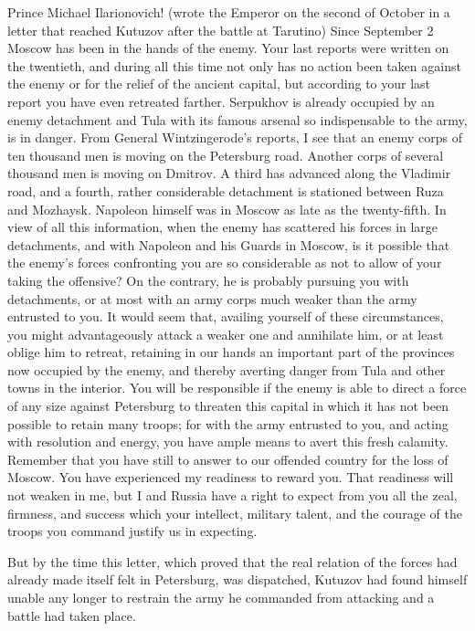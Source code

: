 Prince Michael Ilarionovich! (wrote the Emperor on the second of
October in a letter that reached Kutuzov after the battle at
Tarutino) Since September 2 Moscow has been in the hands of the
enemy. Your last reports were written on the twentieth, and
during all this time not only has no action been taken against
the enemy or for the relief of the ancient capital, but according
to your last report you have even retreated farther. Serpukhov is
already occupied by an enemy detachment and Tula with its famous
arsenal so indispensable to the army, is in danger. From General
Wintzingerode's reports, I see that an enemy corps of ten
thousand men is moving on the Petersburg road. Another corps of
several thousand men is moving on Dmitrov. A third has advanced
along the Vladimir road, and a fourth, rather considerable
detachment is stationed between Ruza and Mozhaysk. Napoleon
himself was in Moscow as late as the twenty-fifth. In view of all
this information, when the enemy has scattered his forces in
large detachments, and with Napoleon and his Guards in Moscow, is
it possible that the enemy's forces confronting you are so
considerable as not to allow of your taking the offensive? On the
contrary, he is probably pursuing you with detachments, or at
most with an army corps much weaker than the army entrusted to
you. It would seem that, availing yourself of these
circumstances, you might advantageously attack a weaker one and
annihilate him, or at least oblige him to retreat, retaining in
our hands an important part of the provinces now occupied by the
enemy, and thereby averting danger from Tula and other towns in
the interior. You will be responsible if the enemy is able to
direct a force of any size against Petersburg to threaten this
capital in which it has not been possible to retain many troops;
for with the army entrusted to you, and acting with resolution
and energy, you have ample means to avert this fresh
calamity. Remember that you have still to answer to our offended
country for the loss of Moscow. You have experienced my readiness
to reward you. That readiness will not weaken in me, but I and
Russia have a right to expect from you all the zeal, firmness,
and success which your intellect, military talent, and the
courage of the troops you command justify us in expecting.

But by the time this letter, which proved that the real relation
of the forces had already made itself felt in Petersburg, was
dispatched, Kutuzov had found himself unable any longer to
restrain the army he commanded from attacking and a battle had
taken place.

